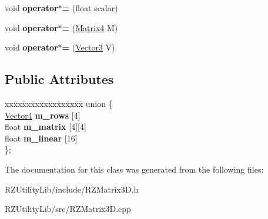 \begin{DoxyCompactItemize}
\item 
\hypertarget{classrcz_engine_1_1_matrix4_a342b40816da74d56a1a72366583a9b0a}{}void {\bfseries operator$\ast$=} (float scalar)\label{classrcz_engine_1_1_matrix4_a342b40816da74d56a1a72366583a9b0a}

\item 
\hypertarget{classrcz_engine_1_1_matrix4_ab7ae67733a6bd0ec7257fa3159008d14}{}void {\bfseries operator$\ast$=} (\hyperlink{classrcz_engine_1_1_matrix4}{Matrix4} M)\label{classrcz_engine_1_1_matrix4_ab7ae67733a6bd0ec7257fa3159008d14}

\item 
\hypertarget{classrcz_engine_1_1_matrix4_a76aded59ff0c9154183c4decbff8e740}{}void {\bfseries operator$\ast$=} (\hyperlink{classrcz_engine_1_1_vector3}{Vector3} V)\label{classrcz_engine_1_1_matrix4_a76aded59ff0c9154183c4decbff8e740}

\end{DoxyCompactItemize}
\subsection*{Public Attributes}
\begin{DoxyCompactItemize}
\item 
\hypertarget{classrcz_engine_1_1_matrix4_a155d88b60c3f61393e5ae0b0f624c379}{}\begin{tabbing}
xx\=xx\=xx\=xx\=xx\=xx\=xx\=xx\=xx\=\kill
union \{\\
\>\hyperlink{classrcz_engine_1_1_vector4}{Vector4} {\bfseries m\_rows} \mbox{[}4\mbox{]}\\
\>float {\bfseries m\_matrix} \mbox{[}4\mbox{]}\mbox{[}4\mbox{]}\\
\>float {\bfseries m\_linear} \mbox{[}16\mbox{]}\\
\}; \label{classrcz_engine_1_1_matrix4_a155d88b60c3f61393e5ae0b0f624c379}
\\

\end{tabbing}\end{DoxyCompactItemize}


The documentation for this class was generated from the following files\+:\begin{DoxyCompactItemize}
\item 
R\+Z\+Utility\+Lib/include/R\+Z\+Matrix3\+D.\+h\item 
R\+Z\+Utility\+Lib/src/R\+Z\+Matrix3\+D.\+cpp\end{DoxyCompactItemize}
